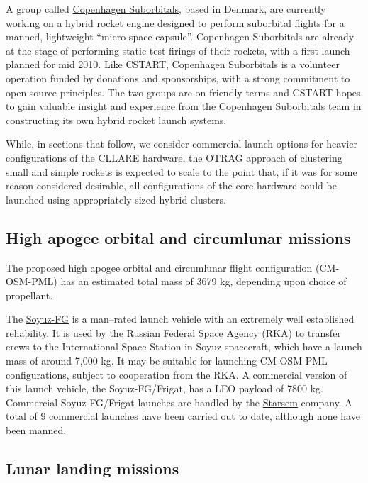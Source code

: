 \documentclass{report}
\begin{document}
A group called \href{http://www.copenhagensuborbitals.com/}{Copenhagen Suborbitals}, based in Denmark, are currently working on a hybrid rocket engine designed to perform suborbital flights for a manned, lightweight ``micro space capsule''.  Copenhagen Suborbitals are already at the stage of performing static test firings of their rockets, with a first launch planned for mid 2010.  Like CSTART, Copenhagen Suborbitals is a volunteer operation funded by donations and sponsorships, with a strong commitment to open source principles.  The two groups are on friendly terms and CSTART hopes to gain valuable insight and experience from the Copenhagen Suborbitals team in constructing its own hybrid rocket launch systems.

While, in sections that follow, we consider commercial launch options for heavier configurations of the CLLARE hardware, the OTRAG approach of clustering small and simple rockets is expected to scale to the point that, if it was for some reason considered desirable, all configurations of the core hardware could be launched using appropriately sized hybrid clusters.

\subsection{High apogee orbital and circumlunar missions}

The proposed high apogee orbital and circumlunar flight configuration (CM-OSM-PML) has an estimated total mass of 3679 kg, depending upon choice of propellant.

The \href{http://en.wikipedia.org/wiki/Soyuz-FG}{Soyuz-FG} is a man--rated launch vehicle with an extremely well established reliability.  It is used by the Russian Federal Space Agency (RKA) to transfer crews to the International Space Station in Soyuz spacecraft, which have a launch mass of around 7,000 kg.  It may be suitable for launching CM-OSM-PML configurations, subject to cooperation from the RKA.  A commercial version of this launch vehicle, the Soyuz-FG/Frigat, has a LEO payload of 7800 kg.  Commercial Soyuz-FG/Frigat launches are handled by the \href{http://www.starsem.com}{Starsem} company.  A total of 9 commercial launches have been carried out to date, although none have been manned.

\subsection{Lunar landing missions}
\end{document}
